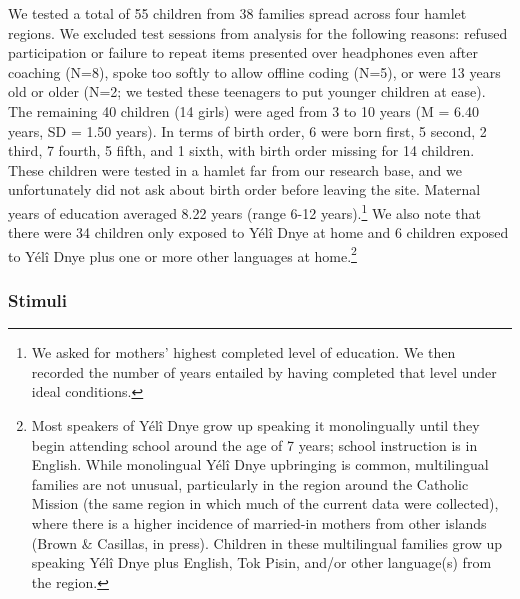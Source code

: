 \documentclass[
  english,
  ,man,floatsintext]{apa6}
\begin{document}
We tested a total of 55 children from 38 families spread across four hamlet regions. We excluded test sessions from analysis for the following reasons: refused participation or failure to repeat items presented over headphones even after coaching (N=8), spoke too softly to allow offline coding (N=5), or were 13 years old or older (N=2; we tested these teenagers to put younger children at ease). The remaining 40 children (14 girls) were aged from 3 to 10 years (M = 6.40 years, SD = 1.50 years). In terms of birth order, 6 were born first, 5 second, 2 third, 7 fourth, 5 fifth, and 1 sixth, with birth order missing for 14 children. These children were tested in a hamlet far from our research base, and we unfortunately did not ask about birth order before leaving the site. Maternal years of education averaged 8.22 years (range 6-12 years).\footnote{We asked for mothers' highest completed level of education. We then recorded the number of years entailed by having completed that level under ideal conditions.} We also note that there were 34 children only exposed to Yélî Dnye at home and 6 children exposed to Yélî Dnye plus one or more other languages at home.\footnote{Most speakers of Yélî Dnye grow up speaking it monolingually until they begin attending school around the age of 7 years; school instruction is in English. While monolingual Yélî Dnye upbringing is common, multilingual families are not unusual, particularly in the region around the Catholic Mission (the same region in which much of the current data were collected), where there is a higher incidence of married-in mothers from other islands (Brown \& Casillas, in press). Children in these multilingual families grow up speaking Yélî Dnye plus English, Tok Pisin, and/or other language(s) from the region.}

\hypertarget{stimuli}{%
\subsubsection{Stimuli}\label{stimuli}}
\end{document}
